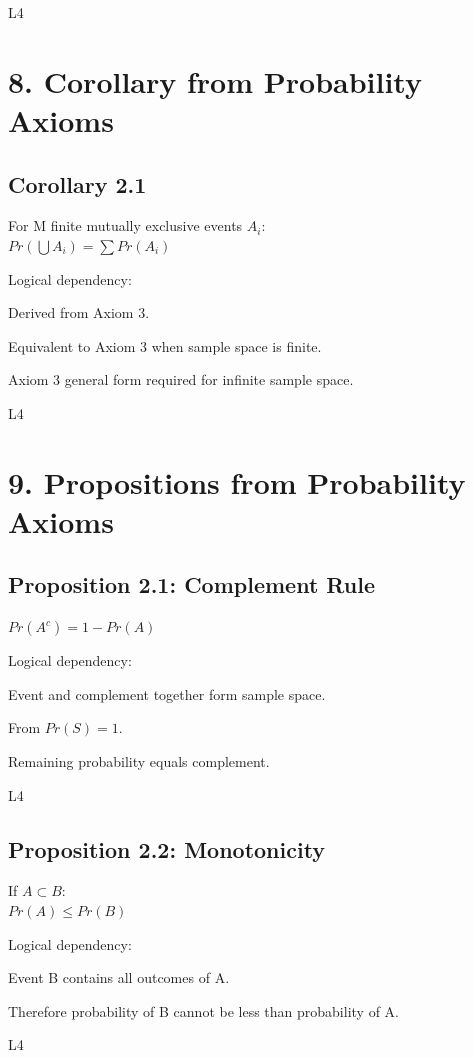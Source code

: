 \documentclass[12pt]{article}
\begin{document}
L4

\section*{8. Corollary from Probability Axioms}

\subsection*{Corollary 2.1}

For M finite mutually exclusive events $A_i$: \\
$Pr\left(\bigcup A_i\right) = \sum Pr(A_i)$

Logical dependency:

Derived from Axiom 3.

Equivalent to Axiom 3 when sample space is finite.

Axiom 3 general form required for infinite sample space. 

L4

\section*{9. Propositions from Probability Axioms}

\subsection*{Proposition 2.1: Complement Rule}

$Pr(A^c) = 1 - Pr(A)$

Logical dependency:

Event and complement together form sample space.

From $Pr(S)=1$.

Remaining probability equals complement. 

L4

\subsection*{Proposition 2.2: Monotonicity}

If $A \subset B$: \\
$Pr(A) \leq Pr(B)$

Logical dependency:

Event B contains all outcomes of A.

Therefore probability of B cannot be less than probability of A. 

L4
\end{document}

